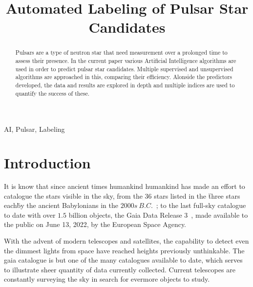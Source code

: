 \documentclass[journal]{IEEEtran}
\begin{document}
\title{Automated Labeling of Pulsar Star Candidates}

\author{
    }

\maketitle

\listoftodos

\begin{abstract}
    Pulsars are a type of neutron star that need measurement over a prolonged
    time to assess their presence. In the current paper various Artificial
    Intelligence algorithms are used in order to predict pulsar star candidates.
    Multiple supervised and unsupervised algorithms are approached in this,
    comparing their efficiency. Alonside the predictors developed, the data and
    results are explored in depth and multiple indices are used to quantify the
    success of these.
\end{abstract}

\begin{IEEEkeywords}
    AI, Pulsar, Labeling
\end{IEEEkeywords}

\section{Introduction\label{sec:intro}} 
It is know that since ancient times humankind humankind has made an effort to
catalogue the stars visible in the sky, from the $36$ stars listed in the
\"three stars each\" by the ancient Babylonians in the $2000s\
B.C.$~\cite{astronomy:history:north}; to the last full-sky catalogue to date
with over $1.5$ billion objects, the Gaia Data Release 3~\cite{gaia:dr3:esa},
made available to the public on June 13, 2022, by the European Space Agency.

With the advent of modern telescopes and satellites, the capability to detect
even the dimmest lights from space have reached heights previously unthinkable.
The gaia catalogue is but one of the many catalogues available to date, which
serves to illustrate sheer quantity of data currently collected. Current
telescopes are constantly surveying the sky in search for evermore objects to
study.
\end{document}
